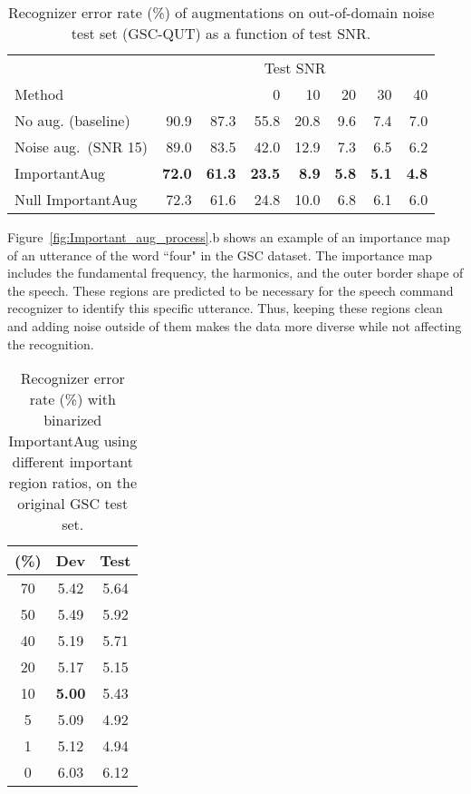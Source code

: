 \documentclass{article}
\begin{document}
\begin{table}
  \caption{Recognizer error rate (\%) of augmentations on out-of-domain noise test set (GSC-QUT) as a function of test SNR.} \label{tab:importantAug_result_QUT}
  \begin{center}
     \scriptsize
    \begin{tabular}{lrrrrrrr}
    \toprule
    & \multicolumn{7}{c}{Test SNR} \\
     Method &   & &0 & 10 & 20 & 30 &40 \\
     \midrule
     No aug. (baseline) & 90.9 & 87.3 & 55.8 & 20.8 & 9.6 & 7.4 & 7.0  \\
       Noise aug.~(SNR 15) & 89.0 & 83.5 & 42.0 & 12.9 & 7.3 & 6.5 & 6.2   \\
        ImportantAug & \textbf{72.0} & \textbf{61.3} & \textbf{23.5} & \textbf{8.9} & \textbf{5.8} & \textbf{5.1} & \textbf{4.8}  \\
        Null ImportantAug & 72.3 & 61.6 & 24.8 & 10.0 & 6.8 & 6.1 & 6.0  \\
      \bottomrule
    \end{tabular}
  \end{center}
\end{table}
Figure~\ref{fig:Important_aug_process}.b shows an example of an importance map of an utterance of the word ``four" in the GSC dataset. The importance map includes the fundamental frequency, the harmonics, and the outer border shape of the speech. These regions are predicted to be necessary for the speech command recognizer to identify this specific utterance. Thus, keeping these regions clean and adding noise outside of them makes the data more diverse while not affecting the recognition. 





\begin{table}
 \caption{Recognizer error rate (\%) with binarized ImportantAug using different important region ratios,  on the original GSC test set.}
 \label{tab:importantAug_result3}
  \begin{center}
\begin{tabular}{ccc}
    \toprule
      (\%)  & Dev & Test  \\ 
     \midrule
70 &  5.42 & 5.64 \\  
     50 &  5.49 &  5.92 \\
     40 &  5.19 &  5.71 \\ 
     20 &  5.17  & 5.15   \\
     10 & \textbf{5.00} & 5.43 \\
      5 &  5.09 &  4.92 \\ 
      1 & 5.12 & 4.94\\
      0 & 6.03 &  6.12\\
     \bottomrule
  \end{tabular}
 \end{center}
\end{table}
\end{document}
